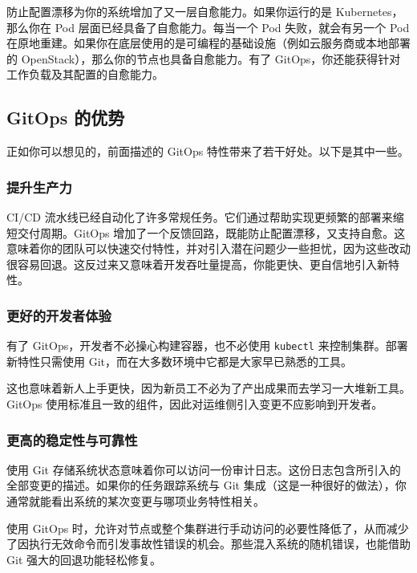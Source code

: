 \label{idx:2073}
防止配置漂移为你的系统增加了又一层自愈能力。如果你运行的是 Kubernetes，那么你在 Pod 层面已经具备了自愈能力。每当一个 Pod 失败，就会有另一个 Pod 在原地重建。如果你在底层使用的是可编程的基础设施（例如云服务商或本地部署的 OpenStack），那么你的节点也具备自愈能力。有了 GitOps，你还能获得针对工作负载及其配置的自愈能力。

\subsection{GitOps 的优势}

\label{idx:2074}
正如你可以想见的，前面描述的 GitOps 特性带来了若干好处。以下是其中一些。

\subsubsection{提升生产力}

\label{idx:2075}
CI/CD 流水线已经自动化了许多常规任务。它们通过帮助实现更频繁的部署来缩短交付周期。GitOps 增加了一个反馈回路，既能防止配置漂移，又支持自愈。这意味着你的团队可以快速交付特性，并对引入潜在问题少一些担忧，因为这些改动很容易回退。这反过来又意味着开发吞吐量提高，你能更快、更自信地引入新特性。

\subsubsection{更好的开发者体验}

\label{idx:2076}
有了 GitOps，开发者不必操心构建容器，也不必使用 \texttt{kubectl} 来控制集群。部署新特性只需使用 Git，而在大多数环境中它都是大家早已熟悉的工具。

\label{idx:2077}
这也意味着新人上手更快，因为新员工不必为了产出成果而去学习一大堆新工具。GitOps 使用标准且一致的组件，因此对运维侧引入变更不应影响到开发者。

\subsubsection{更高的稳定性与可靠性}

\label{idx:2078}
使用 Git 存储系统状态意味着你可以访问一份审计日志。这份日志包含所引入的全部变更的描述。如果你的任务跟踪系统与 Git 集成（这是一种很好的做法），你通常就能看出系统的某次变更与哪项业务特性相关。

使用 GitOps 时，允许对节点或整个集群进行手动访问的必要性降低了，从而减少了因执行无效命令而引发事故性错误的机会。那些混入系统的随机错误，也能借助 Git 强大的回退功能轻松修复。

